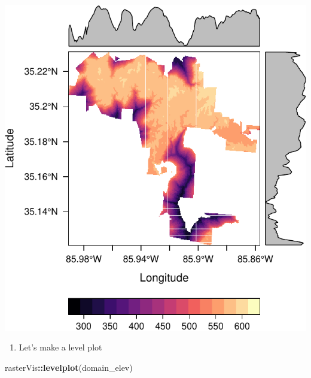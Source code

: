 \documentclass[
]{book}
\newenvironment{Shaded}{\begin{snugshade}}{\end{snugshade}}
\newcommand{\KeywordTok}[1]{\textcolor[rgb]{0.13,0.29,0.53}{\textbf{#1}}}
\newcommand{\NormalTok}[1]{#1}
\newcommand{\OperatorTok}[1]{\textcolor[rgb]{0.81,0.36,0.00}{\textbf{#1}}}
\providecommand{\tightlist}{%
  \setlength{\itemsep}{0pt}\setlength{\parskip}{0pt}}
\begin{document}
\includegraphics{figures/unnamed-chunk-574-1.pdf}

\begin{enumerate}
\def\labelenumi{\arabic{enumi}.}
\setcounter{enumi}{29}
\tightlist
\item
  Let's make a level plot
\end{enumerate}

\begin{Shaded}
\begin{Highlighting}[]
\NormalTok{rasterVis}\OperatorTok{::}\KeywordTok{levelplot}\NormalTok{(domain_elev)}
\end{Highlighting}
\end{Shaded}
\end{document}

